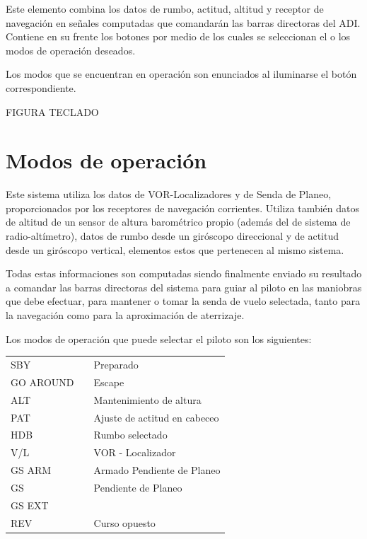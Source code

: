 \documentclass[a4paper,12pt,twoside]{article}
\begin{document}
Este elemento combina los datos de rumbo, actitud, altitud y receptor de 
navegaci\'on en se\~nales computadas que comandar\'an las barras
directoras del ADI.
Contiene en su frente los botones por medio de los cuales se
seleccionan el o los modos de operaci\'on deseados.

Los modos que se encuentran en operaci\'on son enunciados al iluminarse
el bot\'on correspondiente.


FIGURA TECLADO

\section{Modos de operaci\'on}
\label{sec:modos.operacion}

Este sistema utiliza los datos de VOR-Localizadores y de Senda de Planeo,
proporcionados por los receptores de navegaci\'on corrientes.
Utiliza tambi\'en datos de altitud de un sensor de altura barom\'etrico
propio (adem\'as del de sistema de radio-alt\'imetro), datos de rumbo
desde un gir\'oscopo direccional y de actitud desde un gir\'oscopo
vertical, elementos estos que pertenecen al mismo sistema.

Todas estas informaciones son computadas siendo finalmente enviado su
resultado a comandar las barras directoras del sistema para guiar al
piloto en las maniobras que debe efectuar, para mantener o tomar la
senda de vuelo selectada, tanto para la navegaci\'on como para la
aproximaci\'on de aterrizaje.

Los modos de operaci\'on que puede selectar el piloto son los siguientes:

  \begin{tabular}{lm{3mm}l}
    	SBY &  & Preparado \\
	GO AROUND &  & Escape \\
	ALT &  & Mantenimiento de altura    \\
	PAT &  & Ajuste de actitud en cabeceo \\
	HDB &  & Rumbo selectado \\
	V/L &  & VOR - Localizador \\
        GS ARM & & Armado Pendiente de Planeo \\
	GS & & Pendiente de Planeo \\
	GS EXT & &  \\
	REV & & Curso opuesto \\
  \end{tabular}
\end{document}

